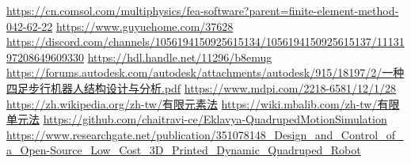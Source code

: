 \newpage
\renewcommand\bibname{參~考~文~獻}
\begin{thebibliography}{99}  %
\href{https://cn.comsol.com/multiphysics/fea-software?parent=finite-element-method-042-62-22}{https://cn.comsol.com/multiphysics/fea-software?parent=finite-element-method-042-62-22}
\href{https://www.guyuehome.com/37628}{https://www.guyuehome.com/37628}
\href{https://discord.com/channels/1056194150925615134/1056194150925615137/1113197208649609330}{https://discord.com/channels/1056194150925615134/1056194150925615137/1113197208649609330}
\href{https://hdl.handle.net/11296/b8emug}{https://hdl.handle.net/11296/b8emug}
\href{https://forums.autodesk.com/autodesk/attachments/autodesk/915/18197/2/一种四足步行机器人结构设计与分析.pdf}{https://forums.autodesk.com/autodesk/attachments/autodesk/915/18197/2/一种四足步行机器人结构设计与分析.pdf}
\href{https://www.mdpi.com/2218-6581/12/1/28}{https://www.mdpi.com/2218-6581/12/1/28}
\href{https://zh.wikipedia.org/zh-tw/有限元素法}{https://zh.wikipedia.org/zh-tw/有限元素法}
\href{https://wiki.mbalib.com/zh-tw/有限单元法}{https://wiki.mbalib.com/zh-tw/有限单元法}
\href{https://github.com/chaitravi-ce/Eklavya-QuadrupedMotionSimulation}{https://github.com/chaitravi-ce/Eklavya-QuadrupedMotionSimulation}
\href{https://www.researchgate.net/publication/351078148_Design_and_Control_of_a_Open-Source_Low_Cost_3D_Printed_Dynamic_Quadruped_Robot}{https://www.researchgate.net/publication/351078148_Design_and_Control_of_a_Open-Source_Low_Cost_3D_Printed_Dynamic_Quadruped_Robot}\label{Quadruped_Robot}

%
\end{thebibliography}
\newpage
